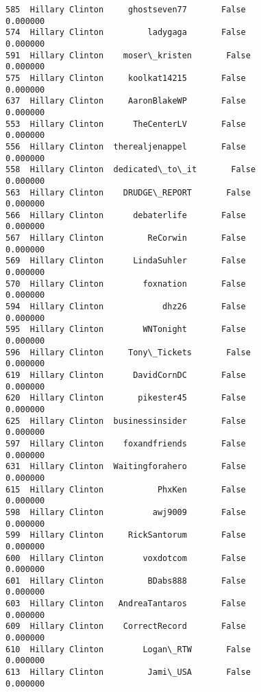 \documentclass[11pt]{article}
\begin{document}
\begin{Verbatim}[commandchars=\\\{\}]
585  Hillary Clinton     ghostseven77       False                0.000000   
574  Hillary Clinton         ladygaga       False                0.000000   
591  Hillary Clinton    moser\_kristen       False                0.000000   
575  Hillary Clinton     koolkat14215       False                0.000000   
637  Hillary Clinton     AaronBlakeWP       False                0.000000   
553  Hillary Clinton      TheCenterLV       False                0.000000   
556  Hillary Clinton  therealjenappel       False                0.000000   
558  Hillary Clinton  dedicated\_to\_it       False                0.000000   
563  Hillary Clinton    DRUDGE\_REPORT       False                0.000000   
566  Hillary Clinton      debaterlife       False                0.000000   
567  Hillary Clinton         ReCorwin       False                0.000000   
569  Hillary Clinton      LindaSuhler       False                0.000000   
570  Hillary Clinton        foxnation       False                0.000000   
594  Hillary Clinton            dhz26       False                0.000000   
595  Hillary Clinton        WNTonight       False                0.000000   
596  Hillary Clinton     Tony\_Tickets       False                0.000000   
619  Hillary Clinton      DavidCornDC       False                0.000000   
620  Hillary Clinton       pikester45       False                0.000000   
625  Hillary Clinton  businessinsider       False                0.000000   
597  Hillary Clinton    foxandfriends       False                0.000000   
631  Hillary Clinton  Waitingforahero       False                0.000000   
615  Hillary Clinton           PhxKen       False                0.000000   
598  Hillary Clinton          awj9009       False                0.000000   
599  Hillary Clinton     RickSantorum       False                0.000000   
600  Hillary Clinton        voxdotcom       False                0.000000   
601  Hillary Clinton         BDabs888       False                0.000000   
603  Hillary Clinton   AndreaTantaros       False                0.000000   
609  Hillary Clinton    CorrectRecord       False                0.000000   
610  Hillary Clinton        Logan\_RTW       False                0.000000   
613  Hillary Clinton         Jami\_USA       False                0.000000   


\end{Verbatim}
\end{document}
